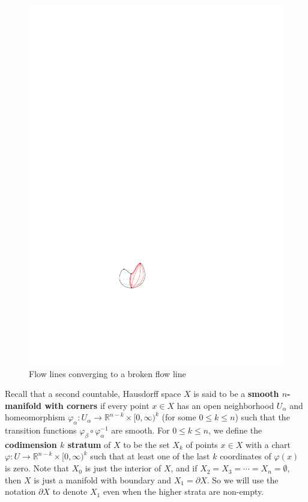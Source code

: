 \begin{figure}[tb]
\centering
\includegraphics[scale=2]{graphics/broken-flow-line-example}
\caption{Flow lines converging to a broken flow line}
\label{broken-flow-line-example}
\end{figure}

Recall that a second countable, Hausdorff space $X$ is said to be a \textbf{smooth $n$-manifold with corners} if every point $x \in X$ has an open neighborhood $U_\alpha$ and homeomorphism $\varphi_\alpha : U_\alpha \rightarrow \mathbb R^{n-k} \times [0,\infty)^k$ (for some $0 \leq k \leq n$) such that the transition functions $\varphi_\beta \circ \varphi_\alpha^{-1}$ are smooth. For $0 \leq k \leq n$, we define the \textbf{codimension $k$ stratum} of $X$ to be the set $X_k$ of points $x \in X$ with a chart $\varphi : U \rightarrow \mathbb R^{n-k} \times [0,\infty)^k$ such that at least one of the last $k$ coordinates of $\varphi(x)$ is zero. Note that $X_0$ is just the interior of $X$, and if $X_2=X_3=\cdots=X_n=\emptyset$, then $X$ is just a manifold with boundary and $X_1 = \partial X$. So we will use the notation $\partial X$ to denote $X_1$ even when the higher strata are non-empty.

